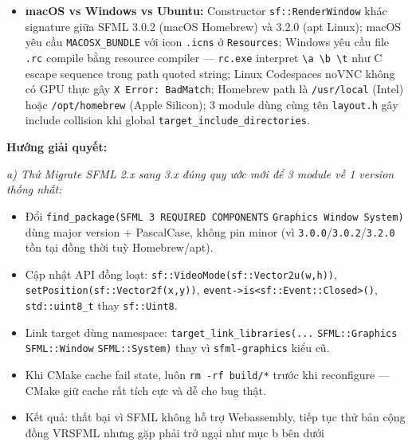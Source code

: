 \documentclass[12pt,a4paper]{article}
\begin{document}
\begin{itemize}
    \item \textbf{macOS vs Windows vs Ubuntu:} Constructor \texttt{sf::RenderWindow} khác signature giữa SFML 3.0.2 (macOS Homebrew) và 3.2.0 (apt Linux); macOS yêu cầu \texttt{MACOSX\_BUNDLE} với icon \texttt{.icns} ở \texttt{Resources}; Windows yêu cầu file \texttt{.rc} compile bằng resource compiler — \texttt{rc.exe} interpret \texttt{\textbackslash a \textbackslash b \textbackslash t} như C escape sequence trong path quoted string; Linux Codespaces noVNC không có GPU thực gây \texttt{X Error: BadMatch}; Homebrew path là \texttt{/usr/local} (Intel) hoặc \texttt{/opt/homebrew} (Apple Silicon); 3 module dùng cùng tên \texttt{layout.h} gây include collision khi global \texttt{target\_include\_\allowbreak directories}.
\end{itemize}

\textbf{Hướng giải quyết:}

\textit{a) Thử Migrate SFML 2.x sang 3.x đúng quy ước mới để 3 module về 1 version thống nhất:}
\begin{itemize}
    \item Đổi \texttt{find\_package(SFML 3 REQUIRED COMPONENTS} \texttt{Graphics Window System)} dùng major version + PascalCase, không pin minor (vì \texttt{3.0.0}/\texttt{3.0.2}/\texttt{3.2.0} tồn tại đồng thời tuỳ Homebrew/apt).
    \item Cập nhật API đồng loạt: \texttt{sf::VideoMode(sf::Vector2u(w,h))}, \texttt{setPosition(sf::Vector2f(x,y))}, \texttt{event->is<sf::Event::Closed>()}, \texttt{std::uint8\_t} thay \texttt{sf::Uint8}.
    \item Link target dùng namespace: \texttt{target\_link\_libraries(...} \texttt{SFML::Graphics} \texttt{SFML::Window} \texttt{SFML::System)} thay vì \texttt{sfml-graphics} kiểu cũ.
    \item Khi CMake cache fail state, luôn \texttt{rm -rf build/*} trước khi reconfigure — CMake giữ cache rất tích cực và dễ che bug thật.
    \item Kết quả: thất bại vì SFML không hỗ trợ Webassembly, tiếp tục thử bản cộng đồng VRSFML nhưng gặp phải trở ngại như mục b bên dưới
\end{itemize}
\end{document}
